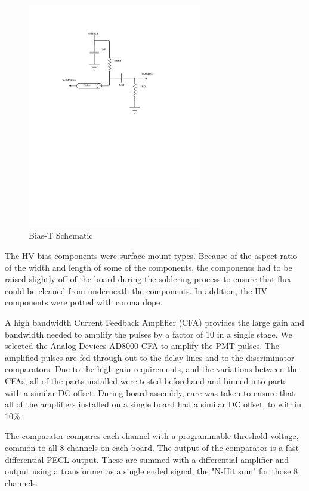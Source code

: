 \documentclass[preprint,12pt]{elsarticle}
\begin{document}
\begin{figure}[h]
\begin{center}
\includegraphics[width=3in, keepaspectratio=true, trim=1.5in 5.5in 2in 1.25in, clip=true]{graphics/bias}
\caption{Bias-T Schematic}
\label{fig:bias}
\end{center}
\end{figure}

The HV bias components were surface mount types.  Because of the
aspect ratio of the width and length of some of the components, the
components had to be raised slightly off of the board during the
soldering process to ensure that flux could be cleaned from underneath
the components.  In addition, the HV components were potted with
corona dope.

A high bandwidth Current Feedback Amplifier (CFA) provides the large
gain and bandwidth needed to amplify the pulses by a factor of 10 in a
single stage.  We selected the Analog Devices AD8000 CFA to amplify
the PMT pulses.  The amplified pulses are fed through out to the delay
lines and to the discriminator comparators.  Due to the high-gain
requirements, and the variations between the CFAs, all of the parts
installed were tested beforehand and binned into parts with a similar
DC offset.  During board assembly, care was taken to ensure that all
of the amplifiers installed on a single board had a similar DC offset,
to within 10\%.

The comparator compares each channel with a programmable threshold
voltage, common to all 8 channels on each board.  The output of the
comparator is a fast differential PECL output.  These are summed with
a differential amplifier and output using a transformer as a single
ended signal, the "N-Hit sum" for those 8 channels.
\end{document}
